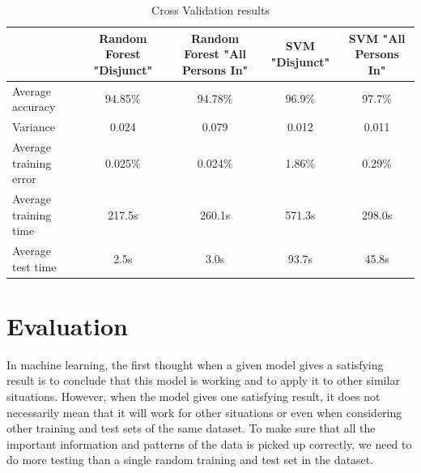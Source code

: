 \documentclass[conference]{IEEEtran}
\begin{document}



\begin{table}[t!]
    \color{baptiste}
    \caption{\color{baptiste}Cross Validation results}
    \begin{center}
    \begin{tabular}{|l|c|c|c|c|}
        \hline
        \textbf{} & \textbf{Random Forest "Disjunct"} & \textbf{Random Forest "All Persons In"} & \textbf{SVM "Disjunct"} & \textbf{SVM "All Persons In"}\\
        \hline
        Average accuracy & 94.85\% & 94.78\% & 96.9\% & 97.7\% \\
        \hline
        Variance & 0.024 & 0.079 & 0.012 & 0.011 \\
        \hline
        Average training error & 0.025\% & 0.024\% & 1.86\% & 0.29\% \\
        \hline
        Average training time & 217.5s & 260.1s & 571.3s & 298.0s \\
        \hline
        Average test time & 2.5s & 3.0s & 93.7s & 45.8s \\
        \hline
    \end{tabular}
    \label{table:CV_results}
    \end{center}
\end{table}
\section{Evaluation}
\textcolor{baptiste}{In machine learning, the first thought when a given model gives a satisfying result is to conclude that this model is working and to apply it to other similar situations. However, when the model gives one satisfying result, it does not necessarily mean that it will work for other situations or even when considering other training and test sets of the same dataset. To make sure that all the important information and patterns of the data is picked up correctly, we need to do more testing than a single random training and test set in the dataset.}
\end{document}
